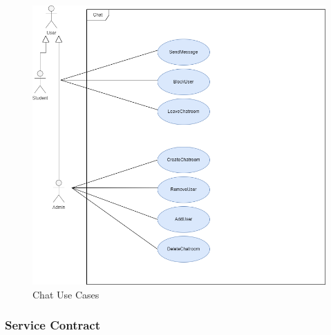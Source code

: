 \documentclass[hidelinks, 12pt, a4paper]{article}
\begin{document}
\begin{figure}[H]

      \centering
      \includegraphics[width = 15cm]{images/Chat Usecase.drawio.png}
      \caption{Chat Use Cases}
      \label{fig:User UseCases}

\end{figure}
\newpage
\subsubsection{Service Contract}
\end{document}
